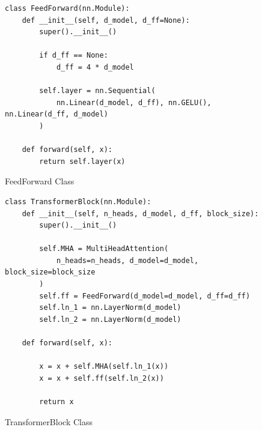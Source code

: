 \documentclass[11pt]{article}
\begin{document}
\begin{figure}[htbp]
	\begin{verbatim}
class FeedForward(nn.Module):
    def __init__(self, d_model, d_ff=None):
        super().__init__()

        if d_ff == None:
            d_ff = 4 * d_model

        self.layer = nn.Sequential(
            nn.Linear(d_model, d_ff), nn.GELU(), nn.Linear(d_ff, d_model)
        )

    def forward(self, x):
        return self.layer(x)
	\end{verbatim}
	\caption{FeedForward Class}
\end{figure}

\begin{figure}[htbp]
	\begin{verbatim}
class TransformerBlock(nn.Module):
    def __init__(self, n_heads, d_model, d_ff, block_size):
        super().__init__()

        self.MHA = MultiHeadAttention(
            n_heads=n_heads, d_model=d_model, block_size=block_size
        )
        self.ff = FeedForward(d_model=d_model, d_ff=d_ff)
        self.ln_1 = nn.LayerNorm(d_model)
        self.ln_2 = nn.LayerNorm(d_model)

    def forward(self, x):

        x = x + self.MHA(self.ln_1(x))
        x = x + self.ff(self.ln_2(x))

        return x
	\end{verbatim}
	\caption{TransformerBlock Class}
\end{figure}
\end{document}
